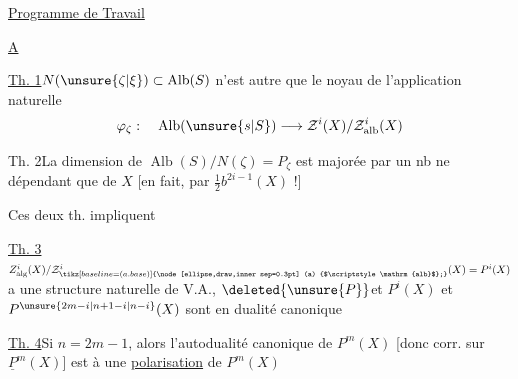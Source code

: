 \begin{center}\uline{Programme de Travail}\end{center}

\uline{A}

\noindent\llap{\smash{\raisebox{-2.2ex}{$\left.\rule{0pt}{4.8ex}\right]$}}\quad}\uline{Th. 1}\qquad $N(\unsure{\zeta|\xi})\subset\operatorname{Alb}(S)$ n'est autre  que le noyau de l'application naturelle
\[
\varphi_{\zeta}:\quad\operatorname{Alb}(\unsure{s|S})\longrightarrow
\mathcal{Z}^{i}(X)/\mathcal{Z}^{i}_{\mathrm{alb}}(X)
\]

\noindent\llap{\smash{\raisebox{-1.5ex}{$\left.\rule{0pt}{3.6ex}\right]$}}\quad}\llap{\smash{\raisebox{-3.3ex}{$\left.\rule{0pt}{3.1ex}\right]$}}\quad}Th. 2\qquad La dimension de $\operatorname{Alb}(S)/N(\zeta)=P_{\zeta}$ est majorée par un nb ne dépendant que de $X$ [en fait, par $\frac{1}{2}b^{2i-1}(X)$ !]

Ces deux th. impliquent

\noindent\llap{\smash{\raisebox{-2.2ex}{$\left.\rule{0pt}{4.8ex}\right]$}}\quad}\uline{Th. 3}\quad $Z^{i}_{\mathrm{alg}}(X)/\mathcal{Z}^{i}_{\tikz[baseline=(a.base)]{\node[ellipse,draw,inner sep=0.3pt] (a) {$\scriptstyle\mathrm{alb}$};}}(X)=P^{i}(X)$ a une structure naturelle de V.A., $\deleted{\unsure{P}}$et $P^{i}(X)$ et $P^{\unsure{2m-i|n+1-i|n-i}}(X)$ sont en dualité canonique

\uline{Th. 4}\quad Si $n=2m-1$, alors l'autodualité canonique de $P^m(X)$ [donc  corr. sur $\underline{P}^m(X)$] est  à une \uline{polarisation} de $P^m(X)$
